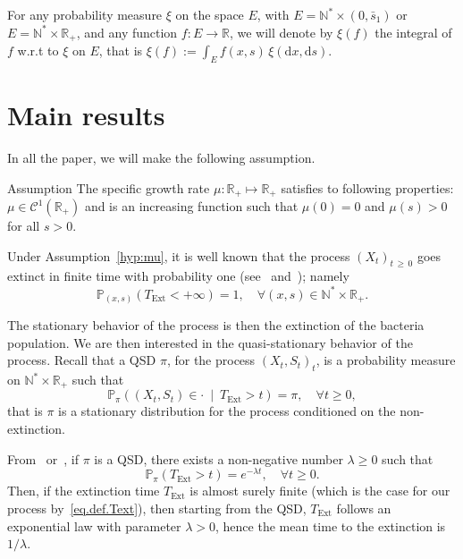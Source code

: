 \documentclass[10pt]{amsart}
\theoremstyle{definition}\newtheorem{defi}[theo]{Definition}\newtheorem{rema}[theo]{Remark}\newtheorem{exam}[theo]{Example}\newtheorem{exem}[theo]{Example}\newtheorem{nota}[theo]{Notation}
\newcommand{\PP}{\mathbb{P}}
\newcommand{\RR}{\mathbb{R}}
\newcommand{\NN}{\mathbb{N}}
\newcommand{\clC}{\mathcal{C}}
\newcommand{\dif}{\mathrm{d}}
\newcommand{\Text}{T_{\mathrm{Ext}}}
\newcommand{\1}{\mathbf{1}}
\let\oldforall\forall
\renewcommand*{\forall}{\mathrel{\oldforall}}
\begin{document}
For any probability measure $\xi$ on the space $E$, with $E=\NN^*\times (0, \bar s_1)$ or $E=\NN^*\times \RR_+$, and any function $f:E\to\RR$, we will denote by $\xi(f)$ the integral of $f$ w.r.t to $\xi$ on $E$, that is $\xi(f):=\int_E f(x,s)\,\xi(\dif x, \dif s)$.



\section{Main results}\label{sec:main.result}



In all the paper, we will make the following assumption.

\begin{enonce}{Assumption}\label{hyp:mu}
The specific growth rate $\mu:\RR_+ \mapsto \RR_+$ satisfies to following properties: $\mu\in\clC^1(\RR_+)$ and is an increasing function such that $\mu(0)=0$ and $\mu(s)>0$ for all $s>0$.
\end{enonce}


Under Assumption~\ref{hyp:mu}, it is well known that the process $(X_t)_{t\,\geq\,0}$ goes extinct in finite time with probability one (see~\cite[Theorem~4 and Remark~7]{CF17} and~\cite[Theorem~3.1]{CMMS}); namely
\begin{equation}\label{eq.def.Text}
\PP_{(x,s)}\left(\Text<+\infty\right)=1, \quad \forall (x,s)\in \NN^*\times \RR_+.
\end{equation}

The stationary behavior of the process is then the extinction of the bacteria population. We are then interested in the quasi-stationary behavior of the process. Recall that a QSD $\pi$, for the process $(X_t,S_t)_t$, is a probability measure on $\NN^*\times \RR_+$ such that
\begin{equation}\label{eq:def_QSD}
\PP_\pi \left((X_t,S_t) \in \cdot \ \middle| \ \Text>t\right) = \pi, \quad \forall t \geq 0,
\end{equation}
that is $\pi$ is a stationary distribution for the process conditioned on the non-extinction.

From~\cite[Proposition~2]{MV12} or~\cite[Theorem~2.2]{CMS13}, if $\pi$ is a QSD, there exists a non-negative number $\lambda\geq 0$ such that
\begin{equation}\label{eq:lambda}
\PP_\pi\left(\Text >t\right) = e^{-\lambda t}, \quad \forall t \geq 0.
\end{equation}
Then, if the extinction time $\Text$ is almost surely finite (which is the case for our process by~\eqref{eq.def.Text}), then starting from the QSD, $\Text$ follows an exponential law with parameter $\lambda>0$, hence the mean time to the extinction is $1/\lambda$.
\end{document}
